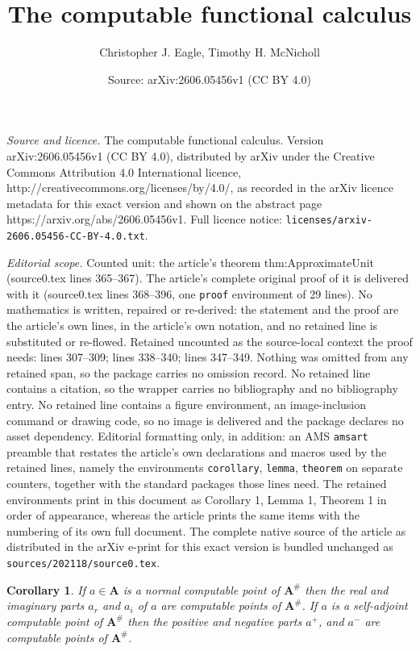 \documentclass[10pt,a4paper]{amsart}
\title{The computable functional calculus}
\author{Christopher J. Eagle, Timothy H. McNicholl}
\date{Source: arXiv:2606.05456v1 (CC BY 4.0)}
\newtheorem{corollary}{Corollary}
\newcommand{\boldA}{\mathbf{A}}
\begin{document}
\maketitle

\noindent\emph{Source and licence.} The computable functional calculus. Version arXiv:2606.05456v1 (CC BY 4.0), distributed by arXiv under the Creative Commons Attribution 4.0 International licence, http://creativecommons.org/licenses/by/4.0/, as recorded in the arXiv licence metadata for this exact version and shown on the abstract page https://arxiv.org/abs/2606.05456v1. Full licence notice: \texttt{licenses/arxiv-2606.05456-CC-BY-4.0.txt}.\par\smallskip

\noindent\textit{Editorial scope.} Counted unit: the article's theorem thm:ApproximateUnit (source0.tex lines 365--367). The article's complete original proof of it is delivered with it (source0.tex lines 368--396, one \texttt{proof} environment of 29 lines). No mathematics is written, repaired or re-derived: the statement and the proof are the article's own lines, in the article's own notation, and no retained line is substituted or re-flowed.  Retained uncounted as the source-local context the proof needs: lines 307--309; lines 338--340; lines 347--349.  Nothing was omitted from any retained span, so the package carries no omission record.  No retained line contains a citation, so the wrapper carries no bibliography and no bibliography entry.  No retained line contains a figure environment, an image-inclusion command or drawing code, so no image is delivered and the package declares no asset dependency.  Editorial formatting only, in addition: an AMS \texttt{amsart} preamble that restates the article's own declarations and macros used by the retained lines, namely the environments \texttt{corollary}, \texttt{lemma}, \texttt{theorem} on separate counters, together with the standard packages those lines need.  The retained environments print in this document as Corollary 1, Lemma 1, Theorem 1 in order of appearance, whereas the article prints the same items with the numbering of its own full document.  The complete native source of the article as distributed in the arXiv e-print for this exact version is bundled unchanged as \texttt{sources/202118/source0.tex}.
\begin{corollary}\label{corollary:PositiveNegativeParts}
If $a \in \boldA$ is a normal computable point of $\boldA^\#$ then the real and imaginary parts $a_r$ and $a_i$ of $a$ are computable points of $\boldA^\#$.  If $a$ is a self-adjoint computable point of $\boldA^\#$ then the positive and negative parts $a^+$, and $a^-$ are computable points of $\boldA^\#$.
\end{corollary}
\end{document}

